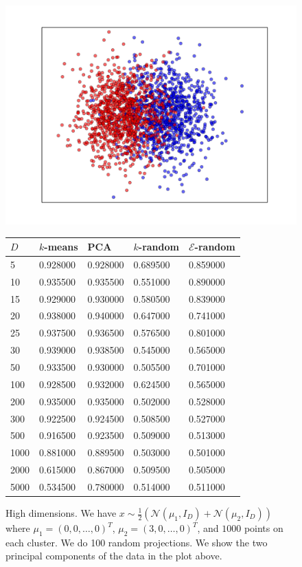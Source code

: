 \documentclass[aps,preprint,nofootinbib,floatfix]{revtex4-1}
\begin{document}
\begin{figure}
\begin{minipage}{.49\textwidth}
\centering
\includegraphics[scale=.45]{30d_gauss.pdf}
\end{minipage}
\begin{minipage}{.5\textwidth}
\renewcommand*{\arraystretch}{.3}
\begin{tabular}{l l l l l}
\hline
$D$ & $k$-means & PCA & $k$-random & $\mathcal{E}$-random \\
\hline
%
5 & 0.928000 & 0.928000 & 0.689500 & 0.859000 \\
10 & 0.935500 & 0.935500 & 0.551000 & 0.890000 \\
15 & 0.929000 & 0.930000 & 0.580500 & 0.839000 \\
20 & 0.938000 & 0.940000 & 0.647000 & 0.741000 \\
25 & 0.937500 & 0.936500 & 0.576500 & 0.801000 \\
30 & 0.939000 & 0.938500 & 0.545000 & 0.565000 \\
50 & 0.933500 & 0.930000 & 0.505500 & 0.701000 \\
100 & 0.928500 & 0.932000 & 0.624500 & 0.565000 \\
200 & 0.935000 & 0.935000 & 0.502000 & 0.528000 \\
300 & 0.922500 & 0.924500 & 0.508500 & 0.527000 \\
500 & 0.916500 & 0.923500 & 0.509000 & 0.513000 \\
1000 & 0.881000 & 0.889500 & 0.503000 & 0.501000 \\
2000 & 0.615000 & 0.867000 & 0.509500 & 0.505000 \\
5000 & 0.534500 & 0.780000 & 0.514000 & 0.511000 \\
%
\hline
\end{tabular}
\end{minipage}
\caption{\label{fig:highd}
High dimensions.
We have $x \sim \tfrac{1}{2}\left( \mathcal{N}(\mu_1, I_D) +
\mathcal{N}(\mu_2, I_D)\right)$ where $\mu_1 = (0,0,\dotsc,0)^T$,
$\mu_2=(3,0,\dots,0)^T$,
and $1000$ points on each cluster. We do 100 random projections.
We show the two principal components
of the data in the plot above.
}
\end{figure}
\end{document}
